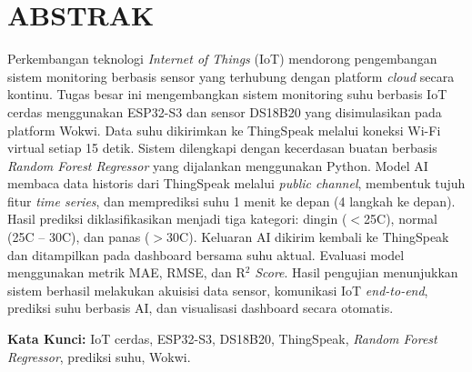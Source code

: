 \clearpage
\chapter*{ABSTRAK}
{}

Perkembangan teknologi \textit{Internet of Things} (IoT) mendorong pengembangan
sistem monitoring berbasis sensor yang terhubung dengan platform \textit{cloud}
secara kontinu. Tugas besar ini mengembangkan sistem monitoring suhu berbasis
IoT cerdas menggunakan ESP32-S3 dan sensor DS18B20 yang disimulasikan pada
platform Wokwi. Data suhu dikirimkan ke ThingSpeak melalui koneksi Wi-Fi
virtual setiap 15 detik. Sistem dilengkapi dengan kecerdasan buatan berbasis
\textit{Random Forest Regressor} yang dijalankan menggunakan Python. Model AI
membaca data historis dari ThingSpeak melalui \textit{public channel},
membentuk tujuh fitur \textit{time series}, dan memprediksi suhu 1 menit ke
depan (4 langkah ke depan). Hasil
prediksi diklasifikasikan menjadi tiga kategori: dingin ($<$25\textdegree C),
normal (25\textdegree C -- 30\textdegree C), dan panas ($>$30\textdegree C).
Keluaran AI dikirim kembali ke ThingSpeak dan ditampilkan pada dashboard
bersama suhu aktual. Evaluasi model menggunakan metrik MAE, RMSE, dan R$^2$
\textit{Score}. Hasil pengujian menunjukkan sistem berhasil melakukan akuisisi
data sensor, komunikasi IoT \textit{end-to-end}, prediksi suhu berbasis AI,
dan visualisasi dashboard secara otomatis.

\vspace{0.7cm}
\noindent\textbf{Kata Kunci:} IoT cerdas, ESP32-S3, DS18B20, ThingSpeak,
\textit{Random Forest Regressor}, prediksi suhu, Wokwi.
